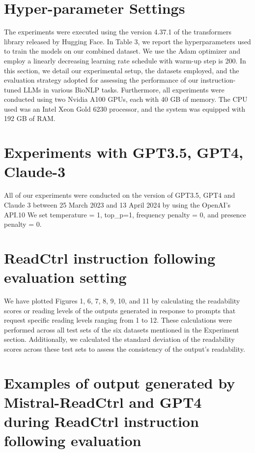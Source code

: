 \documentclass[11pt]{article}
\begin{document}
\section{Hyper-parameter Settings}
The experiments were executed using the version 4.37.1 of the transformers library released by Hugging Face. In Table 3, we report the hyperparameters used to train the models on our combined dataset. We use the Adam optimizer and employ a linearly decreasing learning rate schedule with warm-up step is 200. In this section, we detail our experimental setup, the datasets employed, and the evaluation strategy adopted for assessing the performance of our instruction-tuned LLMs in various BioNLP tasks. Furthermore, all experiments were conducted using two Nvidia A100 GPUs, each with 40 GB of memory. The CPU used was an Intel Xeon Gold 6230 processor, and the system was equipped with 192 GB of RAM.




\section{Experiments with GPT3.5, GPT4, Claude-3}
All of our experiments were conducted on the version of GPT3.5, GPT4 and Claude 3 between 25 March 2023 and 13 April 2024 by using the OpenAI’s API.10 We set temperature = 1, top\_p=1, frequency penalty = 0, and presence penalty = 0.


\section{ReadCtrl instruction following evaluation setting}
\label{apx:ReadCtrl_following_setting}
We have plotted Figures 1, 6, 7, 8, 9, 10, and 11 by calculating the readability scores or reading levels of the outputs generated in response to prompts that request specific reading levels ranging from 1 to 12. These calculations were performed across all test sets of the six datasets mentioned in the Experiment section. Additionally, we calculated the standard deviation of the readability scores across these test sets to assess the consistency of the output's readability.

\section{Examples of output generated by Mistral-ReadCtrl and GPT4 during ReadCtrl instruction following evaluation}
\label{apx:ReadCtrl_following_setting}
\end{document}
